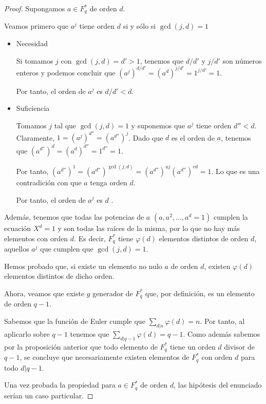 \begin{proof}
	Supongamos $a \in F^*_q$ de orden $d$.
	
	Veamos primero que $a^j$ tiene orden $d$ si y sólo si $\gcd(j, d) = 1$
	
	\begin{itemize}
		\item Necesidad
		
		Si tomamos $j$ con $\gcd(j, d) = d' > 1$, tenemos que $d/d'$ y $j/d'$ son números enteros y podemos concluir que $(a^j)^{d/d'} = (a^d)^{j/d'} = 1^{j/d'} = 1$.
		
		Por tanto, el orden de $a^j$ es $d/d' < d$.
		
		\item Suficiencia
		
		Tomamos $j$ tal que $\gcd(j, d) = 1$ y suponemos que $a^j$ tiene orden $d'' < d$. Claramente, $1 = (a^j)^{d''} = (a^{d''})^j$. Dado que $d$ es el orden de $a$, tenemos que $(a^{d''})^d = (a^d)^{d''} = 1^{d''} = 1$.
		
		Por tanto, $(a^{d''})^1 = (a^{d''})^{\gcd(j,d)} = (a^{d''})^{uj} (a^{d''})^{vd} = 1$. Lo que es una contradición con que $a$ tenga orden $d$.
		
		Por tanto, el orden de $a^j$ es $d$ .
	\end{itemize}

	Además, tenemos que todas las potencias de $a$ $(a, a^2, \dots, a^d = 1)$ cumplen la ecuación $X^d = 1$ y son todas las raíces de la misma, por lo que no hay más elementos con orden $d$. Es decir, $F^*_q$ tiene $\varphi (d)$ elementos distintos de orden $d$, aquellos $a^j$ que cumplen que $\gcd(j,d) = 1$.
	
	Hemos probado que, si existe un elemento no nulo $a$ de orden $d$, existen $\varphi(d)$ elementos distintos de dicho orden. %
	
	Ahora, veamos que existe $g$ generador de $F^*_q$ que, por definición, es un elemento de orden $q-1$.
	
	Sabemos que la función de Euler cumple que $\displaystyle \sum_{d|n} \varphi(d) = n$. Por tanto, al aplicarlo sobre $q-1$ tenemos que $\displaystyle \sum_{d|q-1} \varphi(d) = q-1$. Como además sabemos por la proposición anterior que todo elemento de $F^*_q$ tiene un orden $d$ divisor de $q-1$, se concluye que necesariamente existen elementos de $F^*_q$ con orden $d$ para todo $d|{q-1}$. 
	
	Una vez probada la propiedad para $a \in F^*_q$ de orden $d$, las hipótesis del enunciado serían un caso particular.
\end{proof}

